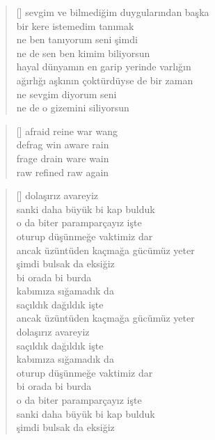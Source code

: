 \documentclass[a5paper, openright, twoside]{memoir}
\begin{document}
\begin{verse}[\versewidth]
  sevgim ve bilmediğim duygularından başka \\
  bir kere istemedim tanımak \\
  ne ben tanıyorum seni şimdi \\
  ne de sen ben kimim biliyorsun \\
  hayal dünyamın en garip yerinde varlığın \\
  ağırlığı aşkının çoktürdüyse de bir zaman \\
  ne sevgim diyorum seni \\
  ne de o gizemini siliyorsun \\
\end{verse}
\begin{verse}[\versewidth]
  afraid reine war wang \\
  defrag win aware rain \\
  frage drain ware wain \\
  raw refined raw again \\
\end{verse}
\begin{verse}[\versewidth]
  dolaşırız avareyiz \\
  sanki daha büyük bi kap bulduk \\
  o da biter paramparçayız işte \\
  oturup düşünmeğe vaktimiz dar \\
  ancak üzüntüden kaçmağa gücümüz yeter \\
  şimdi bulsak da eksiğiz \\
  bi orada bi burda \\
  kabımıza sığamadık da \\
  saçıldık dağıldık işte \\
  ancak üzüntüden kaçmağa gücümüz yeter \\
  dolaşırız avareyiz \\
  saçıldık dağıldık işte \\
  kabımıza sığamadık da \\
  oturup düşünmeğe vaktimiz dar \\
  bi orada bi burda \\
  o da biter paramparçayız işte \\
  sanki daha büyük bi kap bulduk \\
  şimdi bulsak da eksiğiz \\
\end{verse}
\end{document}
